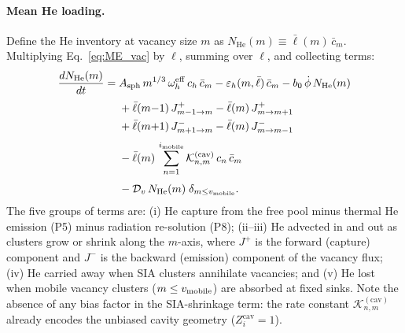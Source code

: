 \documentclass[pdflatex,sn-basic]{sn-jnl} %
\begin{document}
\paragraph{Mean He loading.}
Define the He inventory at vacancy size $m$ as
$N_{\mathrm{He}}(m) \equiv \bar{\ell}(m)\,\bar{c}_m$.
Multiplying Eq.~\eqref{eq:ME_vac} by $\ell$, summing over $\ell$, and
collecting terms:
\begin{equation}\label{eq:case1_NHe}
\begin{split}
    \frac{dN_{\mathrm{He}}(m)}{dt} = {} &
      A_{\mathrm{sph}}\,m^{1/3}\,\omega_h^{\mathrm{eff}}\,
      c_h\,\bar{c}_m
    - \varepsilon_h(m,\bar{\ell})\,\bar{c}_m
    - b_0\,\dot{\phi}\,N_{\mathrm{He}}(m)
    \\[3pt]
    &+ \bar{\ell}(m{-}1)\,J_{m-1 \to m}^{+}
     - \bar{\ell}(m)\,J_{m \to m+1}^{+}
    \\
    &+ \bar{\ell}(m{+}1)\,J_{m+1 \to m}^{-}
     - \bar{\ell}(m)\,J_{m \to m-1}^{-}
    \\[3pt]
    &- \bar{\ell}(m)\,
       \sum_{n=1}^{i_{\rm mobile}}
       \mathcal{K}_{n,m}^{(\mathrm{cav})}\,c_n\,\bar{c}_m
    \\[3pt]
    &- \mathcal{D}_v\,N_{\mathrm{He}}(m)\;\delta_{m \leq v_{\rm mobile}}.
\end{split}
\end{equation}
The five groups of terms are: (i) He capture from the free pool minus
thermal He emission (P5) minus radiation re-solution (P8); (ii--iii) He
advected in and out as clusters grow or shrink along the $m$-axis,
where $J^+$ is the forward (capture) component and $J^-$ is the
backward (emission) component of the vacancy flux; (iv) He carried
away when SIA clusters annihilate vacancies; and (v) He lost when
mobile vacancy clusters ($m \leq v_{\rm mobile}$) are absorbed at fixed
sinks. Note the absence of any
bias factor in the SIA-shrinkage term: the rate constant
$\mathcal{K}_{n,m}^{(\mathrm{cav})}$ already encodes the unbiased
cavity geometry ($Z_i^{\mathrm{cav}} = 1$).
\end{document}
